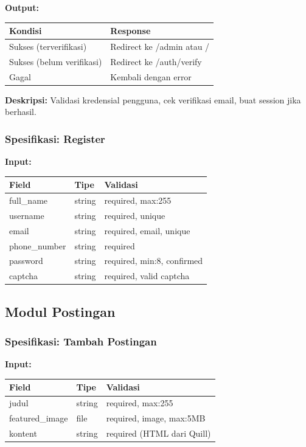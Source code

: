 \documentclass[12pt,a4paper]{article}
\begin{document}
\textbf{Output:}
\begin{table}[h]
\centering
\begin{tabular}{|l|l|}
\hline
\textbf{Kondisi} & \textbf{Response} \\
\hline
Sukses (terverifikasi) & Redirect ke /admin atau / \\
Sukses (belum verifikasi) & Redirect ke /auth/verify \\
Gagal & Kembali dengan error \\
\hline
\end{tabular}
\end{table}

\textbf{Deskripsi:}
Validasi kredensial pengguna, cek verifikasi email, buat session jika berhasil.

\subsubsection{Spesifikasi: Register}

\textbf{Input:}
\begin{table}[h]
\centering
\begin{tabular}{|l|l|l|}
\hline
\textbf{Field} & \textbf{Tipe} & \textbf{Validasi} \\
\hline
full\_name & string & required, max:255 \\
username & string & required, unique \\
email & string & required, email, unique \\
phone\_number & string & required \\
password & string & required, min:8, confirmed \\
captcha & string & required, valid captcha \\
\hline
\end{tabular}
\end{table}

\subsection{Modul Postingan}

\subsubsection{Spesifikasi: Tambah Postingan}

\textbf{Input:}
\begin{table}[h]
\centering
\begin{tabular}{|l|l|l|}
\hline
\textbf{Field} & \textbf{Tipe} & \textbf{Validasi} \\
\hline
judul & string & required, max:255 \\
featured\_image & file & required, image, max:5MB \\
kontent & string & required (HTML dari Quill) \\
\hline
\end{tabular}
\end{table}
\end{document}
